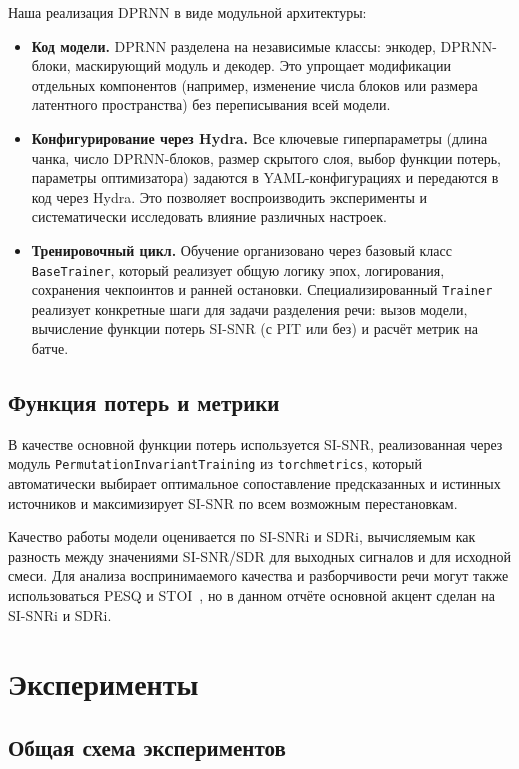 \documentclass[10pt,conference,compsocconf]{IEEEtran}
\begin{document}
Наша реализация DPRNN в виде
модульной архитектуры:
\begin{itemize}
  \item \textbf{Код модели.}
  DPRNN разделена на независимые классы: энкодер, DPRNN-блоки,
  маскирующий модуль и декодер. Это упрощает модификации
  отдельных компонентов (например, изменение числа блоков или
  размера латентного пространства) без переписывания всей модели.
  \item \textbf{Конфигурирование через Hydra.}
  Все ключевые гиперпараметры (длина чанка, число DPRNN-блоков,
  размер скрытого слоя, выбор функции потерь, параметры оптимизатора)
  задаются в YAML-конфигурациях и передаются в код через Hydra.
  Это позволяет воспроизводить эксперименты и систематически
  исследовать влияние различных настроек.
  \item \textbf{Тренировочный цикл.}
  Обучение организовано через базовый класс \texttt{BaseTrainer},
  который реализует общую логику эпох, логирования, сохранения чекпоинтов
  и ранней остановки. Специализированный \texttt{Trainer} реализует
  конкретные шаги для задачи разделения речи: вызов модели, вычисление
  функции потерь SI-SNR (с PIT или без) и расчёт метрик на батче.
\end{itemize}

\subsection{Функция потерь и метрики}

В качестве основной функции потерь используется SI-SNR, реализованная
через модуль \texttt{PermutationInvariantTraining}
из \texttt{torchmetrics}, который автоматически выбирает оптимальное
сопоставление предсказанных и истинных источников и максимизирует
SI-SNR по всем возможным перестановкам.


Качество работы модели оценивается по SI-SNRi и SDRi, вычисляемым
как разность между значениями SI-SNR/SDR для выходных сигналов
и для исходной смеси. Для анализа воспринимаемого качества и разборчивости
речи могут также использоваться PESQ и STOI~\cite{itu_pesq,taal_stoi}, но в данном отчёте
основной акцент сделан на SI-SNRi и SDRi.

\section{Эксперименты}

\subsection{Общая схема экспериментов}
\end{document}

